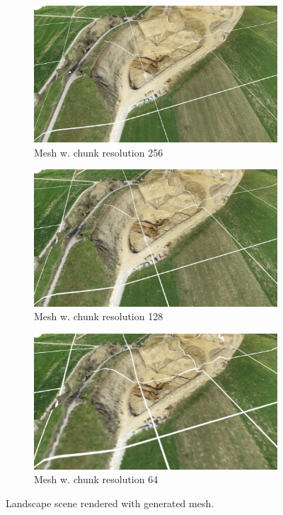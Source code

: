 \begin{figure}[h]
    \centering
    
    \begin{subfigure}{0.7\textwidth}
        \centering
        \includegraphics[width=\textwidth]{figs/results/mesh-landscape-256.jpg}
        \caption{Mesh w. chunk resolution 256}
    \end{subfigure}
    
    \begin{subfigure}{0.7\textwidth}
        \centering
        \includegraphics[width=\textwidth]{figs/results/mesh-landscape-128.jpg}
        \caption{Mesh w. chunk resolution 128}
    \end{subfigure}
    
    \begin{subfigure}{0.7\textwidth}
        \centering
        \includegraphics[width=\textwidth]{figs/results/mesh-landscape-64.jpg}
        \caption{Mesh w. chunk resolution 64}
    \end{subfigure}
    
    \caption{Landscape scene rendered with generated mesh.}
\end{figure}
